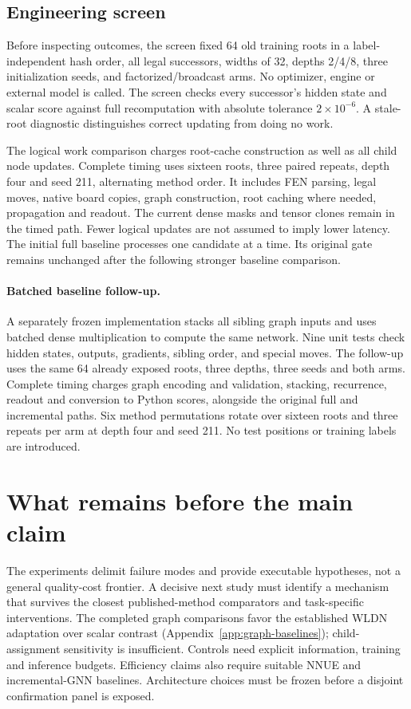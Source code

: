 \documentclass{article}
\begin{document}
\subsection{Engineering screen}
Before inspecting outcomes, the screen fixed 64 old training roots in a
label-independent hash order, all legal successors, widths of 32, depths
2/4/8, three initialization seeds, and factorized/broadcast arms. No optimizer,
engine or external model is called. The screen checks every successor's hidden
state and scalar score against full recomputation with absolute tolerance
$2\times10^{-6}$. A stale-root diagnostic distinguishes correct updating from
doing no work.

The logical work comparison charges root-cache construction as well as all
child node updates. Complete timing uses sixteen roots, three paired repeats,
depth four and seed 211, alternating method order. It includes FEN parsing,
legal moves, native board copies, graph construction, root caching where needed,
propagation and readout. The current dense masks and tensor clones remain in
the timed path. Fewer logical updates are not assumed to imply lower latency.
The initial full baseline processes one candidate at a time. Its original gate
remains unchanged after the following stronger baseline comparison.


\LocalResults{}

\paragraph{Batched baseline follow-up.}
A separately frozen implementation stacks all sibling graph inputs and uses
batched dense multiplication to compute the same network. Nine unit tests check
hidden states, outputs, gradients, sibling order, and special moves. The follow-up
uses the same 64 already exposed roots, three depths, three seeds and both arms.
Complete timing charges graph encoding and validation, stacking, recurrence,
readout and conversion to Python scores, alongside the original full and
incremental paths. Six method permutations rotate over sixteen roots and three
repeats per arm at depth four and seed 211. No test positions or training labels
are introduced. \BatchResults{}



\section{What remains before the main claim}
The experiments delimit failure modes and provide executable hypotheses, not a
general quality-cost frontier. A decisive next study must identify a mechanism
that survives the closest published-method comparators and task-specific
interventions. The completed graph comparisons favor the established WLDN
adaptation over scalar contrast (Appendix~\ref{app:graph-baselines}); child-assignment
sensitivity is insufficient. Controls need
explicit information, training and inference budgets. Efficiency claims also
require suitable NNUE and incremental-GNN baselines. Architecture choices must
be frozen before a disjoint confirmation panel is exposed.
\end{document}

